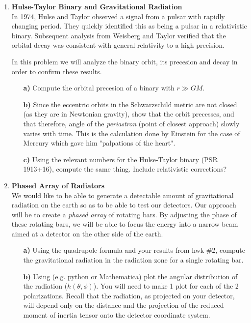 \documentclass[11pt]{article}
\begin{document}
\begin{enumerate}
\item
{\bf Hulse-Taylor Binary and Gravitational Radiation} \\
In 1974, Hulse and Taylor observed a signal from a pulsar with rapidly changing period. They quickly identified this as being a pulsar in a relativistic binary. Subsequent analysis from Weisberg and Taylor verified that the orbital decay was consistent with general relativity to a high precision.

In this problem we will analyze the binary orbit, its precesion and decay in order to confirm these results.
\begin{itemize}

\item[\bf a)] Compute the orbital precesion of a binary with $r \gg G M$.

\item[\bf b)] Since the eccentric orbits in the Schwarzschild metric are not closed (as they are in Newtonian gravity), show that the orbit precesses, and that therefore, angle of the \emph{periastron} (point of closest approach) slowly varies with time. This is the calculation done by Einstein for the case of Mercury which gave him "palpations of the heart".

\item[\bf c)] Using the relevant numbers for the Hulse-Taylor binary (PSR 1913+16), compute the same thing. Include relativistic corrections?

\end{itemize}




\clearpage
\item
{\bf Phased Array of Radiators} \\
We would like to be able to generate a detectable amount of gravitational radiation on the earth so as to be able to test our detectors. Our approach will be to create a \emph{phased array} of rotating bars. By adjusting the phase of these rotating bars, we will be able to focus the energy into a narrow beam aimed at a detector on the other side of the earth.
\begin{itemize}

\item[\bf a)] Using the quadrupole formula and your results from hwk \#2, compute the gravitational radiation in the radiation zone for a single rotating bar.

\item[\bf b)] Using (e.g. python or Mathematica) plot the angular distribution of the radiation ($h(\theta, \phi)$). You will need to make 1 plot for each of the 2 polarizations. Recall that the radiation, as projected on your detector, will depend only on the distance and the projection of the reduced moment of inertia tensor onto the detector coordinate system.


\end{itemize}
\end{enumerate}
\end{document}
